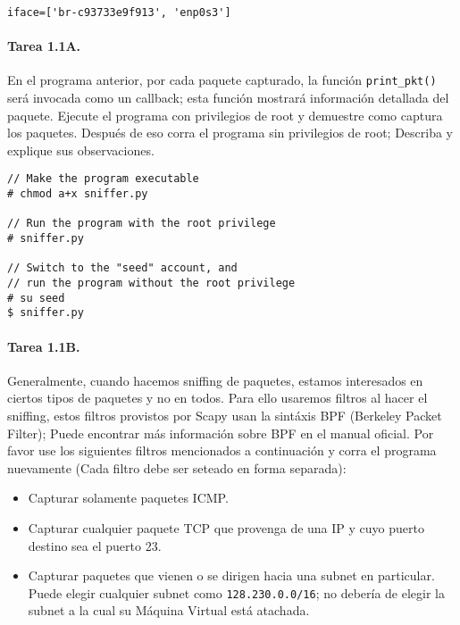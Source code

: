\begin{lstlisting}
iface=['br-c93733e9f913', 'enp0s3']
\end{lstlisting}
 


\paragraph{Tarea 1.1A.} En el programa anterior, por cada paquete capturado, la función \texttt{print\_pkt()} será invocada como un callback; esta función mostrará información detallada del paquete. Ejecute el programa con privilegios de root y demuestre como captura los paquetes. Después de eso corra el programa sin privilegios de root; Describa y explique sus observaciones.
 
\begin{lstlisting}
// Make the program executable 
# chmod a+x sniffer.py

// Run the program with the root privilege
# sniffer.py

// Switch to the "seed" account, and
// run the program without the root privilege
# su seed
$ sniffer.py
\end{lstlisting}


\paragraph{Tarea 1.1B.} Generalmente, cuando hacemos sniffing de paquetes, estamos interesados en ciertos tipos de paquetes y no en todos. Para ello usaremos filtros al hacer el sniffing, estos filtros provistos por Scapy usan la sintáxis BPF (Berkeley Packet Filter); Puede encontrar más información sobre BPF en el manual oficial. Por favor  use los siguientes filtros mencionados a continuación y corra el programa nuevamente (Cada filtro debe ser seteado en forma separada):

\begin{itemize} 
 \item Capturar solamente paquetes ICMP.
 \item Capturar cualquier paquete TCP que provenga de una IP y cuyo puerto destino sea el puerto 23.
  \item Capturar paquetes que vienen o se dirigen hacia una subnet en particular. Puede elegir cualquier subnet como \texttt{128.230.0.0/16}; no debería de elegir la subnet a la cual su Máquina Virtual está atachada.
\end{itemize} 



